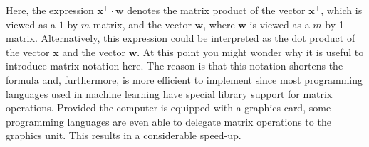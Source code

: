 Here, the expression $\mathbf{x}^\top \cdot \mathbf{w}$ denotes the matrix product of the vector
$\mathbf{x}^\top$, which is viewed as a $1$-by-$m$ matrix, and the vector $\mathbf{w}$, where $\mathbf{w}$ is
viewed as a $m$-by-1 matrix.  Alternatively, this
expression could be interpreted as the dot product of the vector $\mathbf{x}$ and the vector $\mathbf{w}$.
At this point you might wonder why it is useful to introduce matrix notation here.  The reason is
that this notation shortens the formula and, furthermore, is more efficient to implement since most
programming languages used in machine learning have special library support for matrix operations.  
Provided the computer is equipped with a graphics card,  some
programming languages are even able to delegate matrix operations to the graphics unit.  This results in a
considerable speed-up.

